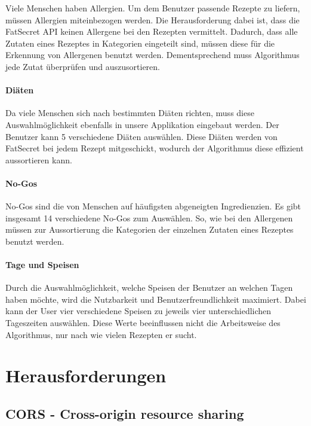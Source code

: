 Viele Menschen haben Allergien. Um dem Benutzer passende Rezepte zu liefern, müssen Allergien miteinbezogen werden. Die Herausforderung dabei ist, dass die FatSecret API keinen Allergene bei den Rezepten vermittelt. Dadurch, dass alle Zutaten eines Rezeptes in Kategorien eingeteilt sind, müssen diese für die Erkennung von Allergenen benutzt werden. Dementsprechend muss Algorithmus jede Zutat überprüfen und auszusortieren.

\paragraph{Diäten}

Da viele Menschen sich nach bestimmten Diäten richten, muss diese Auswahlmöglichkeit ebenfalls in unsere Applikation eingebaut werden. Der Benutzer kann 5 verschiedene Diäten auswählen. Diese Diäten werden von FatSecret bei jedem Rezept mitgeschickt, wodurch der Algorithmus diese effizient aussortieren kann.

\paragraph{No-Gos}

No-Gos sind die von Menschen auf häufigsten abgeneigten Ingredienzien. Es gibt insgesamt 14 verschiedene No-Gos zum Auswählen. So, wie bei den Allergenen müssen zur Aussortierung die Kategorien der einzelnen Zutaten eines Rezeptes benutzt werden.

\paragraph{Tage und Speisen}

Durch die Auswahlmöglichkeit, welche Speisen der Benutzer an welchen Tagen haben möchte, wird die Nutzbarkeit und Benutzerfreundlichkeit maximiert. Dabei kann der User vier verschiedene Speisen zu jeweils vier unterschiedlichen Tageszeiten auswählen. Diese Werte beeinflussen nicht die Arbeitsweise des Algorithmus, nur nach wie vielen Rezepten er sucht.

\section{Herausforderungen}

\subsection{CORS - Cross-origin resource sharing}

